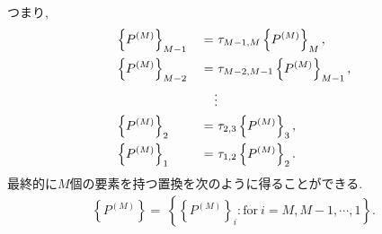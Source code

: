 つまり, 
\begin{alignat}{4}
 &\left\{P^{(M)}\right\}_{M-1} &~ = ~& \tau_{M-1, M} \left\{P^{(M)}\right\}_{M} ,
  \notag
  \\
 &\left\{P^{(M)}\right\}_{M-2} &~ = ~& \tau_{M-2, M-1} \left\{P^{(M)}\right\}_{M-1} ,
  \notag
  \\
 &                       &\vdots  &
  \notag
  \\
 &\left\{P^{(M)}\right\}_{2}   &~ = ~& \tau_{2, 3}     \left\{P^{(M)}\right\}_{3} ,
  \notag
  \\
 &\left\{P^{(M)}\right\}_{1}   &~ = ~& \tau_{1, 2}     \left\{P^{(M)}\right\}_{2} .
  \notag
\end{alignat}
最終的に$M$個の要素を持つ置換を次のように得ることができる. 
\begin{align}
 \left\{P^{(M)}\right\} = ~
 \left\{
        \left\{P^{(M)}\right\}_{i}
        \mathrm{ : for } ~i = M, M-1, \cdots, 1
 \right\}.
\end{align}



\clearpage

